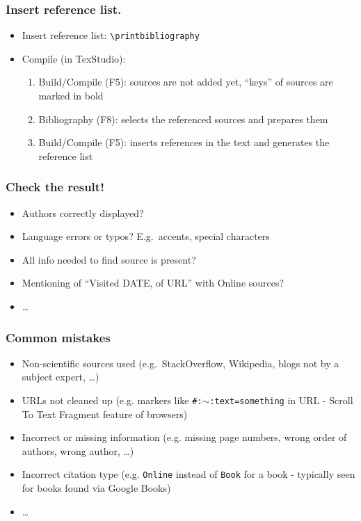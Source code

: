 \documentclass[aspectratio=169]{beamer}
\begin{document}
\begin{frame}[fragile]
  \frametitle{Insert reference list.}

  \begin{itemize}
    \item Insert reference list: \verb|\printbibliography|

    \item Compile (in TexStudio):

          \begin{enumerate}
            \item Build/Compile (F5): sources are not added yet, ``keys'' of sources are marked in bold
            \item Bibliography (F8): selects the referenced sources and prepares them
            \item Build/Compile (F5): inserts references in the text and generates the reference list
          \end{enumerate}
  \end{itemize}
\end{frame}

\begin{frame}
  \frametitle{Check the result!}
  \begin{itemize}
    \item Authors correctly displayed?
    \item Language errors or typos? E.g.\ accents, special characters
    \item All info needed to find source is present?
    \item Mentioning of ``Visited DATE, of URL'' with Online sources?
    \item \ldots
  \end{itemize}
\end{frame}

\begin{frame}
  \frametitle{Common mistakes}

  \begin{itemize}
    \item Non-scientific sources used (e.g.\ StackOverflow, Wikipedia, blogs not by a subject expert, \ldots)
    \item URLs not cleaned up (e.g. markers like \texttt{\#:$\sim$:text=something} in URL - Scroll To Text Fragment feature of browsers)
    \item Incorrect or missing information (e.g. missing page numbers, wrong order of authors, wrong author, \ldots)
    \item Incorrect citation type (e.g. \texttt{Online} instead of \texttt{Book} for a book - typically seen for books found via Google Books)
    \item \ldots
  \end{itemize}
\end{frame}
\end{document}
